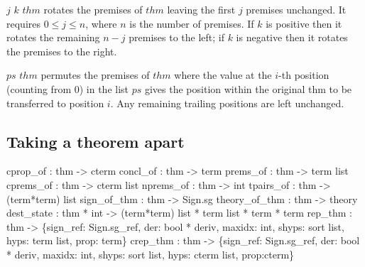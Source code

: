 \begin{ttdescription}
\item[\ttindexbold{permute_prems} $j$ $k$ $thm$] rotates the premises of $thm$
  leaving the first $j$ premises unchanged.  It
  requires $0\leq j\leq n$, where $n$ is the number of premises.  If $k$ is
  positive then it rotates the remaining $n-j$ premises to the left; if $k$ is
  negative then it rotates the premises to the right.

\item[\ttindexbold{rearrange_prems} $ps$ $thm$] permutes the premises of $thm$
   where the value at the $i$-th position (counting from $0$) in the list $ps$
   gives the position within the original thm to be transferred to position $i$.
   Any remaining trailing positions are left unchanged.
\end{ttdescription}


\subsection{Taking a theorem apart}
\begin{ttbox} 
cprop_of      : thm -> cterm
concl_of      : thm -> term
prems_of      : thm -> term list
cprems_of     : thm -> cterm list
nprems_of     : thm -> int
tpairs_of     : thm -> (term*term) list
sign_of_thm   : thm -> Sign.sg
theory_of_thm : thm -> theory
dest_state : thm * int -> (term*term) list * term list * term * term
rep_thm    : thm -> \{sign_ref: Sign.sg_ref, der: bool * deriv, maxidx: int,
                     shyps: sort list, hyps: term list, prop: term\}
crep_thm   : thm -> \{sign_ref: Sign.sg_ref, der: bool * deriv, maxidx: int,
                     shyps: sort list, hyps: cterm list, prop:{\ts}cterm\}
\end{ttbox}

